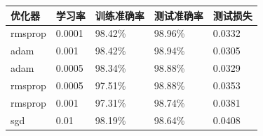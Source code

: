 \begin{tabular}{lllll}
\toprule
优化器 & 学习率 & 训练准确率 & 测试准确率 & 测试损失 \\
\midrule
rmsprop & 0.0001 & 98.42\% & 98.96\% & 0.0332 \\
adam & 0.001 & 98.42\% & 98.94\% & 0.0305 \\
adam & 0.0005 & 98.34\% & 98.88\% & 0.0329 \\
rmsprop & 0.0005 & 97.51\% & 98.88\% & 0.0353 \\
rmsprop & 0.001 & 97.31\% & 98.74\% & 0.0381 \\
sgd & 0.01 & 98.19\% & 98.64\% & 0.0408 \\
\bottomrule
\end{tabular}
